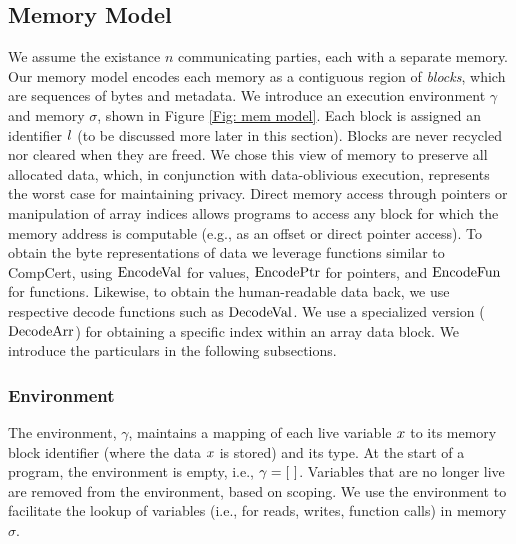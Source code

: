 
\subsection{Memory Model} \label{subsec: mem model}
We assume the existance $n$ communicating parties, each with a separate memory.
Our memory model encodes each memory as a contiguous region of {\em blocks}, which are sequences of bytes and metadata.
We introduce an execution environment $\gamma$ and memory $\sigma$, shown in Figure \ref{Fig: mem model}.
Each block is assigned an identifier $l$ (to be discussed more later in this section). 
Blocks are never recycled nor cleared when they are freed. We chose this view of memory to preserve all allocated data, which, in conjunction with data-oblivious execution, represents the worst case for maintaining privacy. 
Direct memory access through pointers or manipulation of array indices allows programs to access any block for which the memory address is computable (e.g., as an offset or direct pointer access). 
To obtain the byte representations of data we leverage functions similar to CompCert, using $\mathrm{EncodeVal}$ for values, $\mathrm{EncodePtr}$ for pointers, and $\mathrm{EncodeFun}$ for functions. Likewise, to obtain the human-readable data back, we use respective decode functions such as $\mathrm{DecodeVal}$. We use a specialized version ($\mathrm{DecodeArr}$) for obtaining a specific index within an array data block.
We introduce the particulars in the following subsections.



\subsubsection{Environment} 
The environment, $\gamma$, maintains a mapping of each live variable $x$ to its memory block identifier (where the data $x$ is stored) and its type. 
At the start of a program, the environment is empty, i.e., $\gamma = [\-\ ]$. 
Variables that are no longer live are removed from the environment, based on scoping.  
We use the environment to facilitate the lookup of variables (i.e., for reads, writes, function calls) in memory $\sigma$. 



